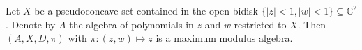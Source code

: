 
Let $X$ be a pseudoconcave set contained in the open bidisk $\{|z| < 1, |w| < 1\} \subseteq \mathbb{C}^2$. Denote by $A$ the algebra of polynomials in $z$ and $w$ restricted to $X$. Then $(A, X, D, \pi)$ with $\pi: (z,w) \mapsto z$ is a maximum modulus algebra.
